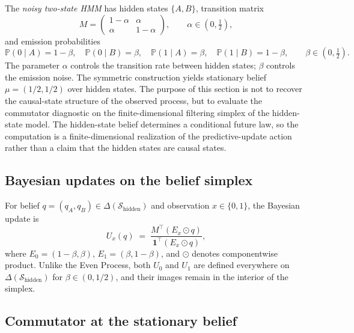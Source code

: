 \documentclass[11pt,a4paper]{article}
\theoremstyle{plain}
\theoremstyle{definition}
\theoremstyle{remark}
\newcommand{\Prob}{\mathbb{P}}
\newcommand{\States}{\mathcal{S}}
\begin{document}
The \emph{noisy two-state HMM} has hidden states $\{A, B\}$, transition matrix
\begin{equation}
    M = \begin{pmatrix} 1 - \alpha & \alpha \\ \alpha & 1 - \alpha \end{pmatrix}, \qquad \alpha \in (0, \tfrac{1}{2}),
\end{equation}
and emission probabilities
\begin{equation}
    \Prob(0 \mid A) = 1 - \beta, \quad \Prob(0 \mid B) = \beta, \quad \Prob(1 \mid A) = \beta, \quad \Prob(1 \mid B) = 1 - \beta, \qquad \beta \in (0, \tfrac{1}{2}).
\end{equation}
The parameter $\alpha$ controls the transition rate between hidden states; $\beta$ controls the emission noise. The symmetric construction yields stationary belief $\mu = (1/2, 1/2)$ over hidden states. The purpose of this section is not to recover the causal-state structure of the observed process, but to evaluate the commutator diagnostic on the finite-dimensional filtering simplex of the hidden-state model. The hidden-state belief determines a conditional future law, so the computation is a finite-dimensional realization of the predictive-update action rather than a claim that the hidden states are causal states.

\subsection{Bayesian updates on the belief simplex}

For belief $q = (q_A, q_B) \in \Delta(\States_{\mathrm{hidden}})$ and observation $x \in \{0, 1\}$, the Bayesian update is
\begin{equation}
\label{eq:hmm-bayes}
    U_x(q) \;=\; \frac{M^\top (E_x \odot q)}{\mathbf{1}^\top (E_x \odot q)},
\end{equation}
where $E_0 = (1 - \beta, \beta)$, $E_1 = (\beta, 1 - \beta)$, and $\odot$ denotes componentwise product. Unlike the Even Process, both $U_0$ and $U_1$ are defined everywhere on $\Delta(\States_{\mathrm{hidden}})$ for $\beta \in (0, 1/2)$, and their images remain in the interior of the simplex.

\subsection{Commutator at the stationary belief}
\end{document}
